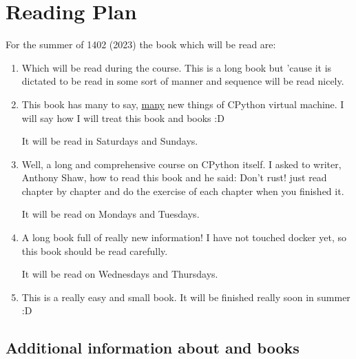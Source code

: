 		\clearpage
		\section{Reading Plan}
			\noindent For the summer of 1402 (2023) the book which will be read are:
			\begin{enumerate}
				\item {}
				
				Which will be read during the  course. This is a long book but 'cause it is dictated to be read in some sort of manner and sequence will be read nicely.
				
				\item {}
				
				This book has many to say, \underline{many} new things of CPython virtual machine. I will say how I will treat this book and  books :D
				
				It will be read in Saturdays and Sundays.
				
				\item {}
				
				Well, a long and comprehensive course on CPython itself. I asked to writer, Anthony Shaw, how to read this book and he said: Don't rust! just read chapter by chapter and do the exercise of each chapter when  you finished it.
				
				It will be read on Mondays and Tuesdays.
				
				\item {}
				
				A long book full of really new information! I have not touched docker yet, so this book should be read carefully.
				
				It will be read on Wednesdays and Thursdays.
				
				\item {}
				
				This is a really easy and small book. It will be finished really soon in summer :D
			\end{enumerate}
			
			\subsection{Additional information about  and  books}
